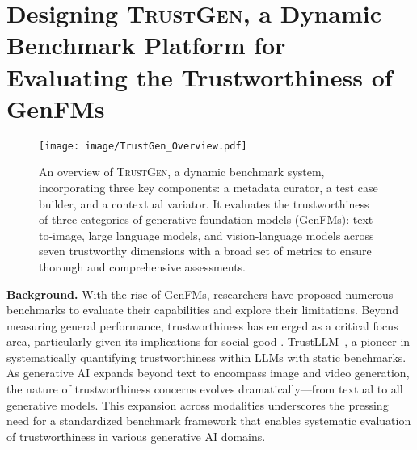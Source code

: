 \clearpage
\section[Designing \textsc{TrustGen} From Guidelines]{Designing \textsc{TrustGen}, a Dynamic Benchmark Platform for Evaluating the Trustworthiness of GenFMs}
\label{sec:benchmark_design}


\begin{figure}[h]
    \centering
    \texttt{[image: image/TrustGen\_Overview.pdf]}
    \caption{An overview of \textsc{TrustGen}, a dynamic benchmark system, incorporating three key components: a metadata curator, a test case builder, and a contextual variator. It evaluates the trustworthiness of three categories of generative foundation models (GenFMs): text-to-image, large language models, and vision-language models across seven trustworthy dimensions with a broad set of metrics to ensure thorough and comprehensive assessments.}
    \label{fig:overview}
\end{figure}

\textbf{Background.} With the rise of GenFMs, researchers have proposed numerous benchmarks to evaluate their capabilities and explore their limitations. Beyond measuring general performance, trustworthiness has emerged as a critical focus area, particularly given its implications for social good \cite{wang2023decodingtrust, huang2024position, hao2024sdm, zhang2024benchmarkingtrustworthinessmultimodallarge}. TrustLLM~\cite{huang2024position}, a pioneer in systematically quantifying trustworthiness within LLMs with static benchmarks. As generative AI expands beyond text to encompass image and video generation, the nature of trustworthiness concerns evolves dramatically—from textual to all generative models. This expansion across modalities underscores the pressing need for a standardized benchmark framework that enables systematic evaluation of trustworthiness in various generative AI domains.

